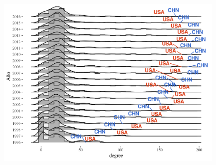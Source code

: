 \documentclass[compress]{beamer}
\begin{document}
\begin{frame}
\begin{columns}[c]
	\begin{flushleft}
		\begin{figure}
			\includegraphics[scale=0.35]{impo_densidad_USAvsCHN_grado_x_yr}
		\end{figure}
	\end{flushleft}
	
\end{columns}
\end{frame}
\end{document}
